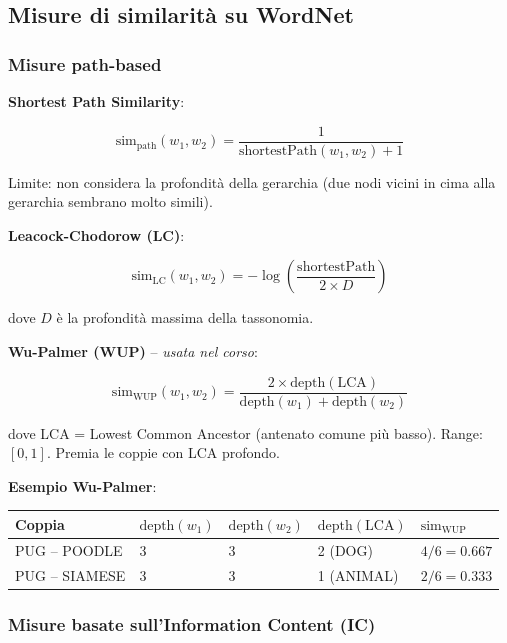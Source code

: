 \documentclass[12pt,a4paper]{article}
\begin{document}
\subsection{Misure di similarità su WordNet}

\subsubsection{Misure path-based}

\textbf{Shortest Path Similarity}:
\begin{formulabox}
\[
\text{sim}_{\text{path}}(w_1, w_2) = \frac{1}{\text{shortestPath}(w_1,w_2) + 1}
\]
\end{formulabox}
Limite: non considera la profondità della gerarchia (due nodi vicini in cima alla gerarchia sembrano molto simili).

\textbf{Leacock-Chodorow (LC)}:
\begin{formulabox}
\[
\text{sim}_{\text{LC}}(w_1, w_2) = -\log\!\left(\frac{\text{shortestPath}}{2 \times D}\right)
\]
\end{formulabox}
dove $D$ è la profondità massima della tassonomia.

\textbf{Wu-Palmer (WUP)} -- \emph{usata nel corso}:
\begin{formulabox}
\[
\text{sim}_{\text{WUP}}(w_1, w_2) = \frac{2 \times \text{depth}(\text{LCA})}{\text{depth}(w_1) + \text{depth}(w_2)}
\]
\end{formulabox}
dove LCA = Lowest Common Ancestor (antenato comune più basso). Range: $[0, 1]$. Premia le coppie con LCA profondo.

\textbf{Esempio Wu-Palmer}:

\begin{center}
\begin{tabular}{lllll}
\toprule
Coppia & $\text{depth}(w_1)$ & $\text{depth}(w_2)$ & $\text{depth}(\text{LCA})$ & $\text{sim}_{\text{WUP}}$ \\
\midrule
PUG -- POODLE & 3 & 3 & 2 (DOG) & $4/6 = 0.667$ \\
PUG -- SIAMESE & 3 & 3 & 1 (ANIMAL) & $2/6 = 0.333$ \\
\bottomrule
\end{tabular}
\end{center}

\subsubsection{Misure basate sull'Information Content (IC)}
\end{document}
